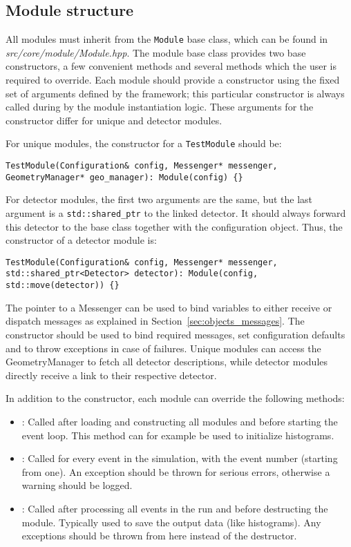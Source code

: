 \subsection{Module structure}
\label{sec:module_structure}
All modules must inherit from the \texttt{Module} base class, which can be found in \textit{src/core/module/Module.hpp}.
The module base class provides two base constructors, a few convenient methods and several methods which the user is required to override.
Each module should provide a constructor using the fixed set of arguments defined by the framework; this particular constructor is always called during by the module instantiation logic.
These arguments for the constructor differ for unique and detector modules.

For unique modules, the constructor for a \texttt{TestModule} should be:
\begin{verbatim}
TestModule(Configuration& config, Messenger* messenger, GeometryManager* geo_manager): Module(config) {}
\end{verbatim}

For detector modules, the first two arguments are the same, but the last argument is a \texttt{std::shared\_ptr} to the linked detector.
It should always forward this detector to the base class together with the configuration object.
Thus, the constructor of a detector module is:
\begin{verbatim}
TestModule(Configuration& config, Messenger* messenger, std::shared_ptr<Detector> detector): Module(config, std::move(detector)) {}
\end{verbatim}

The pointer to a Messenger can be used to bind variables to either receive or dispatch messages as explained in Section~\ref{sec:objects_messages}.
The constructor should be used to bind required messages, set configuration defaults and to throw exceptions in case of failures.
Unique modules can access the GeometryManager to fetch all detector descriptions, while detector modules directly receive a link to their respective detector.

In addition to the constructor, each module can override the following methods:
\begin{itemize}
\item {}: Called after loading and constructing all modules and before starting the event loop.
This method can for example be used to initialize histograms.
\item {}: Called for every event in the simulation, with the event number (starting from one).
An exception should be thrown for serious errors, otherwise a warning should be logged.
\item {}: Called after processing all events in the run and before destructing the module.
Typically used to save the output data (like histograms).
Any exceptions should be thrown from here instead of the destructor.
\end{itemize}

